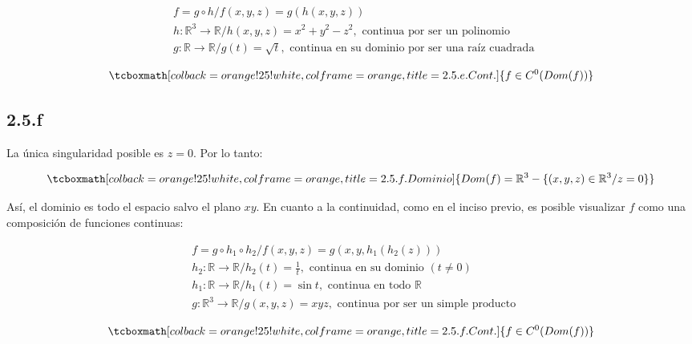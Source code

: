 \documentclass{article}
\renewcommand{\Bbb}{\mathbb}
\begin{document}
\begin{subequations}
\begin{align}
& f = g \circ h / f(x,y,z) = g(h(x,y,z)) \\
& h: \Bbb R^3 \rightarrow \Bbb R / h(x,y,z) = x^2 + y^2 - z^2, \text{ continua por ser un polinomio} \\
& g: \Bbb R \rightarrow \Bbb R / g(t) = \sqrt{t}, \text{ continua en su dominio por ser una raíz cuadrada }
\end{align}
\end{subequations}

\begin{equation}
\tcboxmath[colback=orange!25!white,colframe=orange,title=2.5.e. Cont. ]
{ f \in C^0(\mathop{Dom(f)}) }
\end{equation}

\subsection*{2.5.f}
\label{subsec:2.5.f}

La única singularidad posible es $z = 0$. Por lo tanto:

\begin{equation}
\tcboxmath[colback=orange!25!white,colframe=orange,title=2.5.f. Dominio ]
{ \mathop{Dom}(f) = \Bbb R^3 - \{ (x,y,z) \in \Bbb R^3 / z = 0 \} }
\end{equation}

Así, el dominio es todo el espacio salvo el plano $xy$. En cuanto a la continuidad, como en el inciso previo, es posible visualizar $f$ como una composición de funciones continuas:

\begin{subequations}
\begin{align}
& f = g \circ h_1 \circ h_2 / f(x,y,z) = g(x, y, h_1(h_2(z))) \\
& h_2: \Bbb R \rightarrow \Bbb R / h_2(t) = \frac{1}{t}, \text{ continua en su dominio } (t \neq 0) \\
& h_1: \Bbb R \rightarrow \Bbb R / h_1(t) = \sin{t}, \text{ continua en todo } \Bbb R \\
& g: \Bbb R^3 \rightarrow \Bbb R / g(x,y,z) = xyz, \text{ continua por ser un simple producto }
\end{align}
\end{subequations}

\begin{equation}
\tcboxmath[colback=orange!25!white,colframe=orange,title=2.5.f. Cont. ]
{ f \in C^0(\mathop{Dom(f)}) }
\end{equation}
\end{document}
